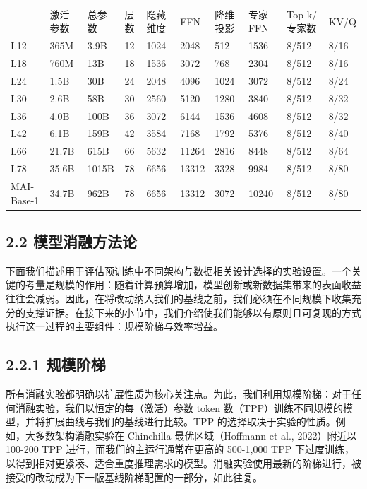 {\def\LTcaptype{none} %
\begin{longtable}[]{@{}llllllllll@{}}
\toprule\noalign{}
\endhead
\bottomrule\noalign{}
\endlastfoot
\multirow{2}{*}{模型} & \multirow{2}{*}{激活参数} &
\multirow{2}{*}{总参数} & \multirow{2}{*}{层数} &
\multirow{2}{*}{隐藏维度} & \multirow{2}{*}{FFN} & \multirow{2}{*}{降维投影} & \multirow{2}{*}{专家 FFN} & \multirow{2}{*}{Top-k/专家数} &
\multirow{2}{*}{KV/Q} \\
 \\
L12 & 365M & 3.9B & 12 & 1024 & 2048 & 512 & 1536 & 8/512 & 8/16 \\
L18 & 760M & 13B & 18 & 1536 & 3072 & 768 & 2304 & 8/512 & 8/16 \\
L24 & 1.5B & 30B & 24 & 2048 & 4096 & 1024 & 3072 & 8/512 & 8/24 \\
L30 & 2.6B & 58B & 30 & 2560 & 5120 & 1280 & 3840 & 8/512 & 8/32 \\
L36 & 4.0B & 100B & 36 & 3072 & 6144 & 1536 & 4608 & 8/512 & 8/32 \\
L42 & 6.1B & 159B & 42 & 3584 & 7168 & 1792 & 5376 & 8/512 & 8/40 \\
L66 & 21.7B & 615B & 66 & 5632 & 11264 & 2816 & 8448 & 8/512 & 8/64 \\
L78 & 35.6B & 1015B & 78 & 6656 & 13312 & 3328 & 9984 & 8/512 & 8/80 \\
MAI-Base-1 & 34.7B & 962B & 78 & 6656 & 13312 & 3072 & 10240 & 8/512 &
8/80 \\
\end{longtable}
}

\subsection{2.2 模型消融方法论}\label{model-ablation-methodology}

下面我们描述用于评估预训练中不同架构与数据相关设计选择的实验设置。一个关键的考量是规模的作用：随着计算预算增加，模型创新或新数据集带来的表面收益往往会减弱。因此，在将改动纳入我们的基线之前，我们必须在不同规模下收集充分的支撑证据。在接下来的小节中，我们介绍使我们能够以有原则且可复现的方式执行这一过程的主要组件：规模阶梯与效率增益。

\subsection{2.2.1 规模阶梯}\label{scaling-ladder}

所有消融实验都明确以扩展性质为核心关注点。为此，我们利用规模阶梯：对于任何消融实验，我们以恒定的每（激活）参数 token 数（TPP）训练不同规模的模型，并将扩展曲线与我们的基线进行比较。TPP 的选择取决于实验的性质。例如，大多数架构消融实验在 Chinchilla 最优区域（Hoffmann et al., 2022）附近以 100-200 TPP 进行，而我们的主运行通常在更高的 500-1,000 TPP 下过度训练，以得到相对更紧凑、适合重度推理需求的模型。消融实验使用最新的阶梯进行，被接受的改动成为下一版基线阶梯配置的一部分，如此往复。


